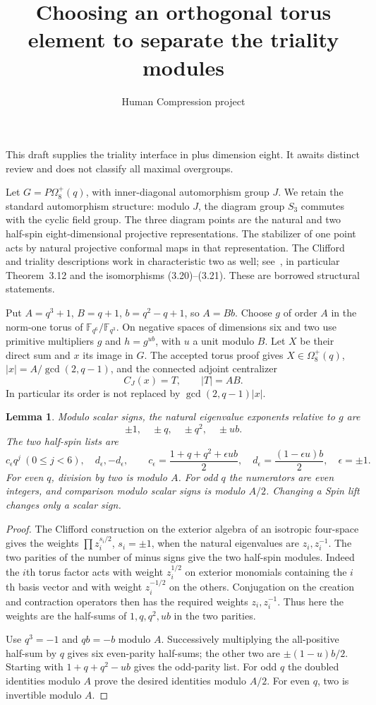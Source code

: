 \documentclass[11pt,a4paper]{article}
\title{Choosing an orthogonal torus element to separate the triality modules}
\author{Human Compression project}\date{}
\newtheorem{lemma}{Lemma}
\newcommand{\F}{\mathbb F}
\newcommand{\Om}{\Omega}
\begin{document}
\maketitle
This draft supplies the triality interface in plus dimension eight.
It awaits distinct review and does not classify all maximal overgroups.

Let $G=P\Om_8^+(q)$, with inner-diagonal automorphism group $J$.
We retain the standard automorphism structure: modulo $J$, the diagram
group $S_3$ commutes with the cyclic field group. The three diagram points
are the natural and two half-spin eight-dimensional projective
representations. The stabilizer of one point acts by natural projective
conformal maps in that representation. The Clifford and triality
descriptions work in characteristic two as well; see~\cite[Sections~3.1
and~3.4]{BT}, in particular Theorem~3.12 and the isomorphisms
(3.20)--(3.21). These are borrowed structural statements.

Put $A=q^3+1$, $B=q+1$, $b=q^2-q+1$, so $A=Bb$.
Choose $g$ of order $A$ in the norm-one torus of
$\F_{q^6}/\F_{q^3}$. On negative spaces of dimensions six and two use
primitive multipliers $g$ and $h=g^{ub}$, with $u$ a unit modulo $B$.
Let $X$ be their direct sum and $x$ its image in $G$.
The accepted torus proof gives $X\in\Om_8^+(q)$,
$|x|=A/\gcd(2,q-1)$, and the connected adjoint centralizer
\[
                      C_J(x)=T,\qquad |T|=AB.                 \tag{1}
\]
In particular its order is not replaced by $\gcd(2,q-1)|x|$.

\begin{lemma}\label{weights}
Modulo scalar signs, the natural eigenvalue exponents relative to $g$
are
\[
                       \pm1,\quad\pm q,\quad\pm q^2,\quad\pm ub.
\]
The two half-spin lists are
\[
 c_\epsilon q^j\ (0\le j<6),\quad d_\epsilon,-d_\epsilon,\qquad
 c_\epsilon=\frac{1+q+q^2+\epsilon ub}{2},\quad
 d_\epsilon=\frac{(1-\epsilon u)b}{2},\quad\epsilon=\pm1.       \tag{2}
\]
For even $q$, division by two is modulo $A$. For odd $q$ the numerators
are even integers, and comparison modulo scalar signs is modulo $A/2$.
Changing a Spin lift changes only a scalar sign.
\end{lemma}
\begin{proof}
The Clifford construction on the exterior algebra of an isotropic
four-space gives the weights $\prod z_i^{s_i/2}$, $s_i=\pm1$, when the
natural eigenvalues are $z_i,z_i^{-1}$. The two parities of the number
of minus signs give the two half-spin modules. Indeed the $i$th torus
factor acts with weight $z_i^{1/2}$ on exterior monomials containing
the $i$th basis vector and with weight $z_i^{-1/2}$ on the others.
Conjugation on the creation and contraction operators then has the
required weights $z_i,z_i^{-1}$. Thus here the weights are the
half-sums of $1,q,q^2,ub$ in the two parities.

Use $q^3=-1$ and $qb=-b$ modulo $A$. Successively multiplying the
all-positive half-sum by $q$ gives six even-parity half-sums;
the other two are $\pm(1-u)b/2$. Starting with
$1+q+q^2-ub$ gives the odd-parity list. For odd $q$ the doubled
identities modulo $A$ prove the desired identities modulo $A/2$.
For even $q$, two is invertible modulo $A$.
\end{proof}
\end{document}
